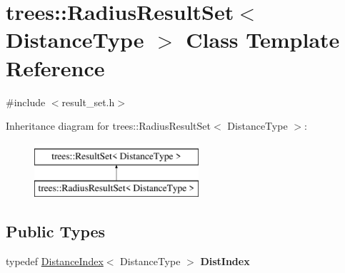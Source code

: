 \hypertarget{classtrees_1_1_radius_result_set}{}\section{trees\+:\+:Radius\+Result\+Set$<$ Distance\+Type $>$ Class Template Reference}
\label{classtrees_1_1_radius_result_set}


{\ttfamily \#include $<$result\+\_\+set.\+h$>$}

Inheritance diagram for trees\+:\+:Radius\+Result\+Set$<$ Distance\+Type $>$\+:\begin{figure}[H]
\begin{center}
\leavevmode
\includegraphics[height=2.000000cm]{classtrees_1_1_radius_result_set}
\end{center}
\end{figure}
\subsection*{Public Types}
\begin{DoxyCompactItemize}
\item 
\mbox{\label{classtrees_1_1_radius_result_set_a553d1b7b948e3647afce9e168b0cf5a4}} 
typedef \hyperlink{structtrees_1_1_distance_index}{Distance\+Index}$<$ Distance\+Type $>$ {\bfseries Dist\+Index}
\end{DoxyCompactItemize}
